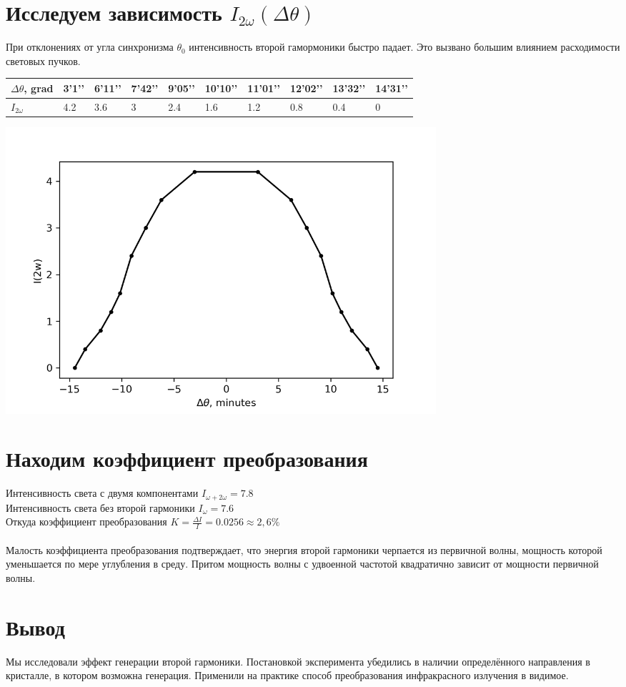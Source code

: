 \documentclass[a4paper,10pt]{article} %
\begin{document}
\section{Исследуем зависимость $I_{2\omega} (\Delta \theta)$}
При отклонениях от угла синхронизма $\theta_0$ интенсивность второй гамормоники быстро падает. Это вызвано большим влиянием расходимости световых пучков.

\begin{table}[H]
\begin{tabular}{|l|l|l|l|l|l|l|l|l|l|}
\hline
$\Delta \theta$, grad & 3’1’’ & 6’11’’ & 7’42’’ & 9’05’’ & 10’10’’ & 11’01’’ & 12’02’’ & 13’32’’ & 14’31’’ \\ \hline
$I_{2 \omega}$           & 4.2   & 3.6    & 3      & 2.4    & 1.6     & 1.2     & 0.8     & 0.4     & 0       \\ \hline
\end{tabular}
\end{table}

\begin{center}
\includegraphics[width = 0.7\textwidth]{images/plot_2}
\end{center}

\section{Находим коэффициент преобразования}
Интенсивность света с двумя компонентами $I_{\omega + 2 \omega} = 7.8$\\
Интенсивность света без второй гармоники $I_{\omega} = 7.6$\\
Откуда коэффициент преобразования   $K = \frac{\Delta I}{I} = 0.0256 \approx 2,6 \%$\\\\
Малость коэффициента преобразования подтверждает, что энергия второй гармоники черпается из первичной волны, мощность которой уменьшается по мере углубления в среду.
Притом мощность волны с удвоенной частотой квадратично зависит от мощности первичной волны.
\section{Вывод}
Мы исследовали эффект генерации второй гармоники. Постановкой эксперимента убедились в наличии определённого направления в кристалле, в котором возможна генерация. Применили на практике способ преобразования инфракрасного излучения в видимое.
\end{document}
